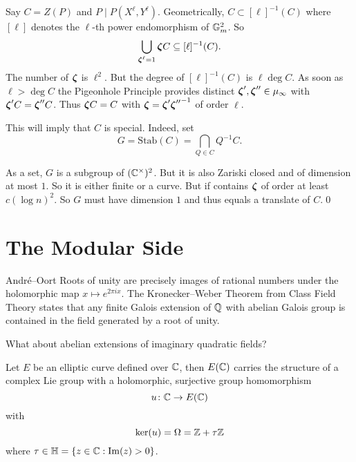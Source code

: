 \documentclass{beamer}
\begin{document}
\begin{frame}
  Say $C=Z(P)$ and $P\mid P(X^\ell,Y^\ell)$. 
  Geometrically, $C \subset [\ell]^{-1}(C)$ where $[\ell]$ denotes the $\ell$-th
  power endomorphism of ${\mathbb{G}}_m^2$.
  So
  \begin{equation*}
    \bigcup_{{\boldsymbol{\zeta}}^\ell=1} {\boldsymbol{\zeta}} C \subseteq [\ell]^{-1}(C).
  \end{equation*}
  The number of ${\boldsymbol{\zeta}}$ is
  $\ell^2$. But the degree of $[\ell]^{-1}(C)$ is $\ell \deg C$. As soon
  as $\ell > \deg C$ the Pigeonhole Principle provides distinct
  ${\boldsymbol{\zeta}}',{\boldsymbol{\zeta}}''\in \mu_\infty$ with ${\boldsymbol{\zeta}}' C = {\boldsymbol{\zeta}}''C$.
  Thus
  ${\boldsymbol{\zeta}} C=C$ with ${\boldsymbol{\zeta}} = {\boldsymbol{\zeta}}'{{\boldsymbol{\zeta}}''}^{-1}$ of order
  $\ell$.

  

  This will imply that $C$ is special. Indeed, set
  \begin{equation*}
    G =  \mathrm{Stab}(C) = \bigcap_{Q\in C} Q^{-1} C.
  \end{equation*}

  As a set, $G$ is a subgroup of $({\mathbb{C}}^\times)^2$. But it is also Zariski
  closed and of dimension at most $1$. So it is either finite or a
  curve. But if contains  ${\boldsymbol{\zeta}}$ of order at least $c(\log n)^2$.
  So $G$ must have dimension $1$ and
   thus  equals a translate of $C$.\qed
\end{frame}

\section{The Modular Side}
\begin{frame}{Andr\'e--Oort}
  Roots of unity are precisely images of rational numbers under the
  holomorphic map $x\mapsto e^{2\pi i x}$. The Kronecker--Weber
  Theorem from Class Field Theory states that any finite Galois
  extension of ${\mathbb{Q}}$ with abelian Galois group is contained in the field
  generated by a root of unity.

  What about abelian extensions of imaginary quadratic fields?

  Let $E$ be an elliptic curve  defined over ${\mathbb{C}}$, then
  $E({\mathbb{C}})$ carries the structure of
  a complex Lie group with a holomorphic, surjective group homomorphism
  \begin{equation*}
    u \colon {\mathbb{C}} \rightarrow E({\mathbb{C}})
  \end{equation*}
  with
  \begin{equation*}
    \mathrm{ker}(u) =\Omega = {\mathbb{Z}}+\tau{\mathbb{Z}}
  \end{equation*}
  where $\tau\in {\mathbb{H}} = \{z\in {\mathbb{C}} : \mathrm{Im}(z)>0\}$. 
\end{frame}
\end{document}
